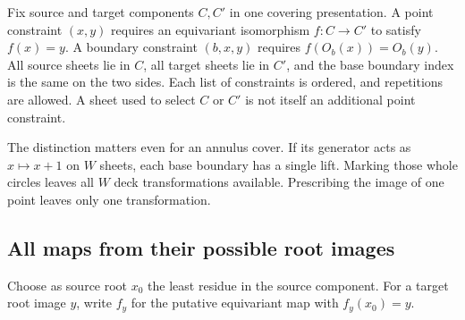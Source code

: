 \begin{definition}
Fix source and target components $C,C'$ in one covering presentation.
A point constraint $(x,y)$ requires an equivariant isomorphism $f:C\to C'$
to satisfy $f(x)=y$.  A boundary constraint $(b,x,y)$ requires
$f(O_b(x))=O_b(y)$.  All source sheets lie in $C$, all target sheets lie in
$C'$, and the base boundary index is the same on the two sides.  Each
list of constraints is ordered, and repetitions are allowed.  A sheet
used to select $C$ or $C'$ is not itself an additional point constraint.
\end{definition}

The distinction matters even for an annulus cover.  If its generator acts
as $x\mapsto x+1$ on $W$ sheets, each base boundary has a single lift.
Marking those whole circles leaves all $W$ deck transformations available.
Prescribing the image of one point leaves only one transformation.

\subsection{All maps from their possible root images}

Choose as source root $x_0$ the least residue in the source component.
For a target root image $y$, write $f_y$ for the putative equivariant map
with $f_y(x_0)=y$.

